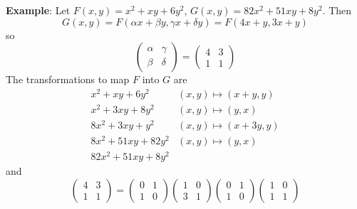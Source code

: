 \documentclass[12pt]{article}
\theoremstyle{definition}
\begin{document}
\textbf{Example}: Let $F(x,y)=x^2+xy+6y^2$, $G(x,y)=82x^2+51xy+8y^2$. Then
\[G(x,y)=F(\alpha x + \beta y, \gamma x+\delta y)=F(4x+y,3x+y)\]
so
\begin{displaymath}
\left( \begin{array}{cc}
\alpha & \gamma \\
\beta & \delta
\end{array}\right)
=
\left( \begin{array}{cc}
4 & 3 \\
1 & 1
\end{array}\right)
\end{displaymath}
The transformations to map $F$ into $G$ are
\[
\begin{array}{rl}
x^2+xy+6y^2&(x,y)\mapsto(x+y,y)\\[2pt]
x^2+3xy+8y^2&(x,y)\mapsto(y,x)\\[2pt]
8x^2+3xy+y^2&(x,y)\mapsto(x+3y,y)\\[2pt]
8x^2+51xy+82y^2&(x,y)\mapsto(y,x)\\[2pt]
82x^2+51xy+8y^2
\end{array}
\]
and
\[
\left( \begin{array}{cc}
4 & 3 \\
1 & 1
\end{array}\right)=
\left( \begin{array}{cc}
0 & 1 \\
1 & 0
\end{array}\right)
\left( \begin{array}{cc}
1 & 0 \\
3 & 1
\end{array}\right)
\left( \begin{array}{cc}
0 & 1 \\
1 & 0
\end{array}\right)
\left( \begin{array}{cc}
1 & 0 \\
1 & 1
\end{array}\right)
\]
\end{document}
